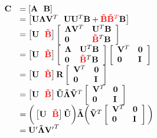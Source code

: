 \begin{equation}
\begin{array}{llll}
\mathbf{C} &= \left[{\mathbf{A}} \ \ \mathbf{B}\right]\\
&= \left[\mathbf{U}\mathbf{\Lambda}\mathbf{V}^T \ \ \mathbf{U}\mathbf{U}^T\mathbf{B} + {\color{red}\mathbf{\tilde{B}}} {\color{red}\mathbf{\tilde{B}}^T}{\mathbf{B}}\right]\\
&= \left[\mathbf{U} \ \ {\color{red}\mathbf{\tilde{B}}}\right]\left[\begin{array}{llll}\mathbf{\Lambda}\mathbf{V}^T &\mathbf{U}^T\mathbf{B}\\ \mathbf{0} & {\color{red}\mathbf{\tilde{B}}}^T\mathbf{B}\end{array}\right]\\
&= \left[\mathbf{U} \ \ {\color{red}\mathbf{\tilde{B}}}\right]\left[\begin{array}{llll}\mathbf{\Lambda} & \mathbf{U}^T\mathbf{B}\\ \mathbf{0} & {\color{red}\mathbf{\tilde{B}}}^T\mathbf{B}\end{array}\right] \left[\begin{array}{llll}\mathbf{V}^T & \mathbf{0}\\ \mathbf{0} & \mathbf{I}\end{array}\right]\\
&= \left[\mathbf{U} \ \ {\color{red}\mathbf{\tilde{B}}}\right]\mathbf{R} \left[\begin{array}{llll}\mathbf{V}^T & \mathbf{0}\\ \mathbf{0} & \mathbf{I}\end{array}\right]\\
 &= \left[\mathbf{U} \ \ {\color{red}\mathbf{\tilde{B}}}\right]\mathbf{\tilde{U}}\mathbf{\tilde{\Lambda}}\mathbf{\tilde{V}}^T \left[\begin{array}{llll}\mathbf{V}^T & \mathbf{0}\\ \mathbf{0} & \mathbf{I}\end{array}\right]\\
&= \bigg(\left[\mathbf{U} \ \ {\color{red}\mathbf{\tilde{B}}}\right]\mathbf{\tilde{U}}\bigg) \mathbf{\tilde{\Lambda}} \bigg(\mathbf{\tilde{V}}^T \left[\begin{array}{llll}\mathbf{V}^T & \mathbf{0}\\ \mathbf{0} & \mathbf{I}\end{array}\right]\bigg)\\
&=\mathbf{U'}\mathbf{\tilde{\Lambda}}\mathbf{V'}^T
\end{array}
\label{Eqn:iSVDmain}
\end{equation}

